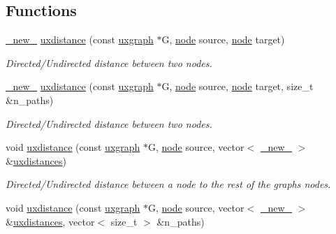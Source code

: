 \subsection*{Functions}
\begin{DoxyCompactItemize}
\item 
\hyperlink{namespacelgraph_1_1utils_a2c84bfde888c42ab3ad6b2cb8a364240}{\+\_\+new\+\_\+} \hyperlink{namespacelgraph_1_1traversal_a73bb6b5984fc97e12576ca4f16344fbf}{uxdistance} (const \hyperlink{classlgraph_1_1utils_1_1uxgraph}{uxgraph} $\ast$G, \hyperlink{namespacelgraph_1_1utils_a7bd66ede3805ef121bc2835bd48de0cf}{node} source, \hyperlink{namespacelgraph_1_1utils_a7bd66ede3805ef121bc2835bd48de0cf}{node} target)
\begin{DoxyCompactList}\small\item\em Directed/\+Undirected distance between two nodes. \end{DoxyCompactList}\item 
\hyperlink{namespacelgraph_1_1utils_a2c84bfde888c42ab3ad6b2cb8a364240}{\+\_\+new\+\_\+} \hyperlink{namespacelgraph_1_1traversal_a084aa7ff13d10613c411ff8d4a2dc4c8}{uxdistance} (const \hyperlink{classlgraph_1_1utils_1_1uxgraph}{uxgraph} $\ast$G, \hyperlink{namespacelgraph_1_1utils_a7bd66ede3805ef121bc2835bd48de0cf}{node} source, \hyperlink{namespacelgraph_1_1utils_a7bd66ede3805ef121bc2835bd48de0cf}{node} target, size\+\_\+t \&n\+\_\+paths)
\begin{DoxyCompactList}\small\item\em Directed/\+Undirected distance between two nodes. \end{DoxyCompactList}\item 
void \hyperlink{namespacelgraph_1_1traversal_aa21660a600fa553678d686341226f8e0}{uxdistance} (const \hyperlink{classlgraph_1_1utils_1_1uxgraph}{uxgraph} $\ast$G, \hyperlink{namespacelgraph_1_1utils_a7bd66ede3805ef121bc2835bd48de0cf}{node} source, vector$<$ \hyperlink{namespacelgraph_1_1utils_a2c84bfde888c42ab3ad6b2cb8a364240}{\+\_\+new\+\_\+} $>$ \&\hyperlink{namespacelgraph_1_1traversal_ab04202d9a05b39b38e5e8f35475b1665}{uxdistances})
\begin{DoxyCompactList}\small\item\em Directed/\+Undirected distance between a node to the rest of the graph\textquotesingle{}s nodes. \end{DoxyCompactList}\item 
void \hyperlink{namespacelgraph_1_1traversal_a8b5060314b2349de4757d1509560f9c6}{uxdistance} (const \hyperlink{classlgraph_1_1utils_1_1uxgraph}{uxgraph} $\ast$G, \hyperlink{namespacelgraph_1_1utils_a7bd66ede3805ef121bc2835bd48de0cf}{node} source, vector$<$ \hyperlink{namespacelgraph_1_1utils_a2c84bfde888c42ab3ad6b2cb8a364240}{\+\_\+new\+\_\+} $>$ \&\hyperlink{namespacelgraph_1_1traversal_ab04202d9a05b39b38e5e8f35475b1665}{uxdistances}, vector$<$ size\+\_\+t $>$ \&n\+\_\+paths)

\end{DoxyCompactItemize}
